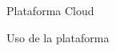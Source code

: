 \begin{subsection}{Plataforma Cloud}
\begin{subsubsection}{Uso de la plataforma}
       
        
    \end{subsubsection}


\end{subsection}
